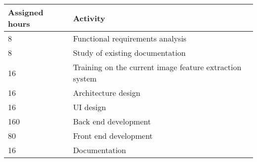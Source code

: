 \begin{center}
    \begin{tabular}{ | p{3cm} | p{9cm} |}
    \hline
    \textbf{Assigned hours} & \textbf{Activity} \\ \hline
    8 & Functional requirements analysis \\ \hline
    8 & Study of existing documentation \\ \hline
    16 & Training on the current image feature extraction system \\ \hline
    16 & Architecture design \\ \hline
    16 & UI design \\ \hline
    160 & Back end development \\ \hline
    80 & Front end development \\ \hline
		16 & Documentation \\ \hline
   \end{tabular}
\end{center}